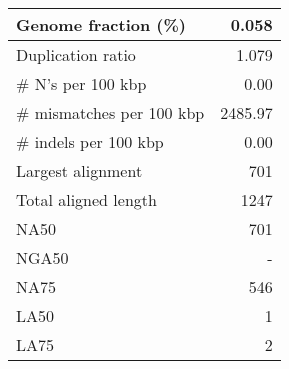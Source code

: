 \documentclass[12pt,a4paper]{article}
\begin{document}
\begin{table}[ht]
\begin{center}
\begin{tabular}{|l*{1}{|r}|}
Genome fraction (\%) & 0.058 \\ \hline
Duplication ratio & 1.079 \\ \hline
\# N's per 100 kbp & 0.00 \\ \hline
\# mismatches per 100 kbp & 2485.97 \\ \hline
\# indels per 100 kbp & 0.00 \\ \hline
Largest alignment & 701 \\ \hline
Total aligned length & 1247 \\ \hline
NA50 & 701 \\ \hline
NGA50 & - \\ \hline
NA75 & 546 \\ \hline
LA50 & 1 \\ \hline
LA75 & 2 \\ \hline
\end{tabular}
\end{center}
\end{table}
\end{document}
